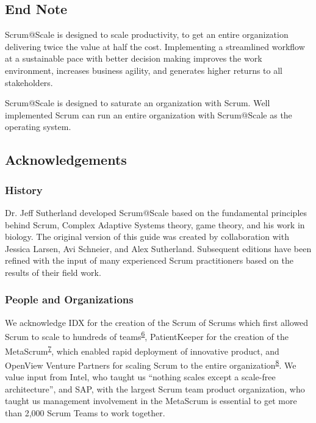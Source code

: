 \documentclass[12pt,a4paper,parskip=full]{scrartcl}
\begin{document}
\subsection{End Note}\label{End-Note}

Scrum@Scale is designed to scale productivity, to get an entire
organization delivering twice the value at half the cost. Implementing a
streamlined workflow at a sustainable pace with better decision making
improves the work environment, increases business agility, and generates
higher returns to all stakeholders.

Scrum@Scale is designed to saturate an organization with Scrum. Well
implemented Scrum can run an entire organization with Scrum@Scale as the
operating system.

\subsection{Acknowledgements}\label{Acknowledgements}

\subsubsection{History}\label{History}

Dr. Jeff Sutherland developed Scrum@Scale based on the fundamental principles behind Scrum, Complex Adaptive Systems theory, game theory, and his work in biology. The original version of this guide was created by collaboration with Jessica Larsen, Avi Schneier, and Alex Sutherland. Subsequent editions have been refined with the input of many experienced Scrum practitioners based on the results of their field work.

\subsubsection{People and Organizations}\label{People-and-Organizations}

We acknowledge IDX for the creation of the Scrum of Scrums which first
allowed Scrum to scale to hundreds of
teams\textsuperscript{\hyperref[citation6]{6}}, PatientKeeper for the
creation of the MetaScrum\textsuperscript{\hyperref[citation7]{7}},
which enabled rapid deployment of innovative product, and OpenView
Venture Partners for scaling Scrum to the entire
organization\textsuperscript{\hyperref[citation8]{8}}. We value input
from Intel, who taught us ``nothing scales except a scale-free
architecture'', and SAP, with the largest Scrum team product
organization, who taught us management involvement in the MetaScrum is
essential to get more than 2,000 Scrum Teams to work together.
\end{document}
